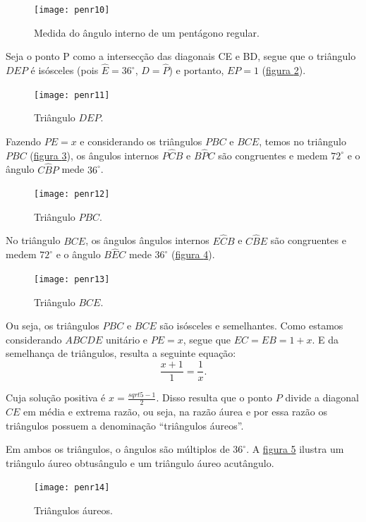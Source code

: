 \begin{figure}[H]
\centering
\texttt{[image: penr10]}
\caption{Medida do ângulo interno de um pentágono regular.}
\label{penr_10}
\end{figure}


Seja o ponto P como a intersecção das diagonais CE e BD, segue que  o triângulo $DEP$ é isósceles (pois $\hat{E}= 36^{\circ}$, $\hat{D}=\hat{P}$) e portanto, $EP=1$ (\hyperref[penr_11]{figura \ref{penr_11}}).

\begin{figure}[H]
	\centering
	\texttt{[image: penr11]}
	\caption{Triângulo $DEP$.}
	\label{penr_11}
\end{figure}


Fazendo $PE =x$ e considerando os triângulos $PBC$ e $BCE$, temos no triângulo $PBC$ (\hyperref[penr_12]{figura \ref{penr_12}}), os ângulos internos $P\hat{C}B$ e $B\hat{P}C$ são congruentes e medem $72^{\circ}$ e o ângulo $C\hat{B}P$ mede $36^{\circ}$. 

\begin{figure}[H]
	\centering
	\texttt{[image: penr12]}
	\caption{Triângulo $PBC$.}
	\label{penr_12}
\end{figure}


No triângulo $BCE$, os ângulos ângulos internos $E\hat{C}B$ e $C\hat{B}E$ são congruentes e medem $72^{\circ}$ e o ângulo $B\hat{E}C$ mede $36^{\circ}$ (\hyperref[penr_13]{figura \ref{penr_13}}).


\begin{figure}[H]
	\centering
	\texttt{[image: penr13]}
	\caption{Triângulo $BCE$.}
	\label{penr_13}
\end{figure}


Ou seja, os triângulos $PBC$ e $BCE$ são isósceles e semelhantes. Como estamos considerando $ABCDE$ unitário e  $PE = x$, segue que $EC= EB = 1+x$. E da semelhança de triângulos, resulta a seguinte equação:
$$\frac{x+1}{1}=\frac{1}{x}.$$

Cuja solução positiva é $x=\frac{sqrt{5}-1}{2}$.
Disso resulta que o ponto $P$ divide a diagonal $CE$ em média e extrema razão, ou seja, na razão áurea e por essa razão os triângulos possuem a denominação “triângulos áureos”. 

Em ambos os triângulos, o ângulos são múltiplos de $36^{\circ}$. A \hyperref[penr_14]{figura \ref{penr_14}}  ilustra um  triângulo áureo obtusângulo e um  triângulo áureo acutângulo.

 \begin{figure}[H]
	\centering
	\texttt{[image: penr14]}
	\caption{Triângulos áureos.}
	\label{penr_14}
\end{figure}



